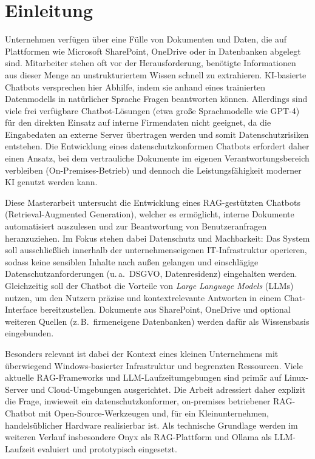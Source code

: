 \pagebreak
\section{Einleitung}\label{sec:einleitung}
Unternehmen verfügen über eine Fülle von Dokumenten und Daten, die auf Plattformen wie Microsoft SharePoint, OneDrive oder in Datenbanken abgelegt sind.
Mitarbeiter stehen oft vor der Herausforderung, benötigte Informationen aus dieser Menge an unstrukturiertem Wissen schnell zu extrahieren.
KI-basierte Chatbots versprechen hier Abhilfe, indem sie anhand eines trainierten Datenmodells in natürlicher Sprache Fragen beantworten können.
Allerdings sind viele frei verfügbare Chatbot-Lösungen (etwa große Sprachmodelle wie GPT-4) für den direkten Einsatz auf interne Firmendaten nicht geeignet, da die Eingabedaten an externe Server übertragen werden und somit Datenschutzrisiken entstehen.
Die Entwicklung eines datenschutzkonformen Chatbots erfordert daher einen Ansatz, bei dem vertrauliche Dokumente im eigenen Verantwortungsbereich verbleiben (On-Premises-Betrieb) und dennoch die Leistungsfähigkeit moderner KI genutzt werden kann.

Diese Masterarbeit untersucht die Entwicklung eines RAG-gestützten Chatbots (Retrieval-Augmented Generation), welcher es ermöglicht, interne Dokumente automatisiert auszulesen und zur Beantwortung von Benutzeranfragen heranzuziehen.
Im Fokus stehen dabei Datenschutz und Machbarkeit: Das System soll ausschließlich innerhalb der unternehmenseigenen IT-Infrastruktur operieren, sodass keine sensiblen Inhalte nach außen gelangen und einschlägige Datenschutzanforderungen (u.\,a.\ DSGVO, Datenresidenz) eingehalten werden.
Gleichzeitig soll der Chatbot die Vorteile von \textit{Large Language Models} (LLMs) nutzen, um den Nutzern präzise und kontextrelevante Antworten in einem Chat-Interface bereitzustellen.
Dokumente aus SharePoint, OneDrive und optional weiteren Quellen (z.\,B.\ firmeneigene Datenbanken) werden dafür als Wissensbasis eingebunden.

Besonders relevant ist dabei der Kontext eines kleinen Unternehmens mit überwiegend Windows-basierter Infrastruktur und begrenzten Ressourcen.
Viele aktuelle RAG-Frameworks und LLM-Laufzeitumgebungen sind primär auf Linux-Server und Cloud-Umgebungen ausgerichtet.
Die Arbeit adressiert daher explizit die Frage, inwieweit ein datenschutzkonformer, on-premises betriebener RAG-Chatbot mit Open-Source-Werkzeugen und, für ein Kleinunternehmen, handelsüblicher Hardware realisierbar ist.
Als technische Grundlage werden im weiteren Verlauf insbesondere Onyx als RAG-Plattform und Ollama als LLM-Laufzeit evaluiert und prototypisch eingesetzt.


